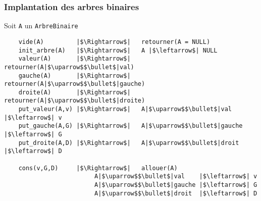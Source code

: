 \documentclass[table,handout,tikz,12pt,svgnames]{beamer}
\begin{document}
\begin{frame}[fragile=singleslide]
	\frametitle{Implantation des arbres binaires}
	\begin{block}{Soit \texttt{A} un \texttt{ArbreBinaire}}
		\begin{verbatim}
	vide(A)         |$\Rightarrow$|   retourner(A = NULL)
	init_arbre(A)   |$\Rightarrow$|   A |$\leftarrow$| NULL
	valeur(A)       |$\Rightarrow$|   retourner(A|$\uparrow$$\bullet$|val)
	gauche(A)       |$\Rightarrow$|   retourner(A|$\uparrow$$\bullet$|gauche)
	droite(A)       |$\Rightarrow$|   retourner(A|$\uparrow$$\bullet$|droite)
	put_valeur(A,v) |$\Rightarrow$|   A|$\uparrow$$\bullet$|val    |$\leftarrow$| v
	put_gauche(A,G) |$\Rightarrow$|   A|$\uparrow$$\bullet$|gauche |$\leftarrow$| G
	put_droite(A,D) |$\Rightarrow$|   A|$\uparrow$$\bullet$|droit  |$\leftarrow$| D

	cons(v,G,D)     |$\Rightarrow$|   allouer(A)
                         A|$\uparrow$$\bullet$|val    |$\leftarrow$| v
                         A|$\uparrow$$\bullet$|gauche |$\leftarrow$| G
                         A|$\uparrow$$\bullet$|droit  |$\leftarrow$| D


		\end{verbatim}
	\end{block}
\end{frame}
\end{document}
